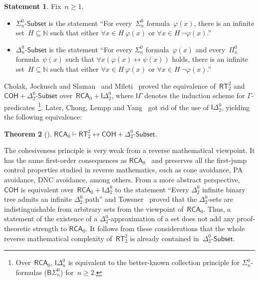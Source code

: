 \documentclass{article}
\def\NN{\mathbb{N}}
\newcommand{\IDelta}{\mathsf{I}\Delta^0}
\newcommand{\BSig}{\mathsf{B}\Sigma^0}
\newcommand{\Sub}[1]{{#1}\mbox{-}\mathsf{Subset}}
\newcommand{\RCA}{\mathsf{RCA}}
\newcommand{\COH}{\mathsf{COH}}
\newcommand{\RT}{\mathsf{RT}}
\def\qt#1{``#1''}%
\newtheorem{theorem}{Theorem}
\numberwithin{theorem}{section}
\theoremstyle{definition}
\newtheorem{statement}[theorem]{Statement}
\begin{document}
\begin{statement}Fix~$n \geq 1$.
\begin{itemize}
    \item $\Sub{\Sigma^0_n}$ is the statement \qt{For every~$\Sigma^0_n$ formula~$\varphi(x)$, there is an infinite set~$H \subseteq \NN$ such that either $\forall x \in H\ \varphi(x)$ or $\forall x \in H\ \neg \varphi(x)$.}
    \item $\Sub{\Delta^0_n}$ is the statement \qt{For every $\Sigma^0_n$ formula~$\varphi(x)$ and every~$\Pi^0_n$ formula~$\psi(x)$ such that $\forall x(\varphi(x) \leftrightarrow \psi(x))$ holds, there is an infinite set~$H \subseteq \NN$ such that either $\forall x \in H\ \varphi(x)$ or $\forall x \in H\ \neg \varphi(x)$.}
\end{itemize}
\end{statement}

Cholak, Jockusch and Slaman~\cite{cholak2001strength} and Mileti~\cite{mileti2004partition} proved the equivalence of~$\RT^2_2$ and $\COH + \Sub{\Delta^0_2}$ over~$\RCA_0 + \IDelta_2$, where $\mathsf{I}\Gamma$ denotes the induction scheme for $\Gamma$-predicates~\footnote{Over~$\RCA_0$, $\IDelta_n$ is equivalent to the better-known collection principle for $\Sigma^0_n$-formulas ($\BSig_n$) for~$n \geq 2$.}. Later, Chong, Lempp and Yang~\cite{chong2010role} got rid of the use of $\IDelta_2$, yielding the following equivalence:

\begin{theorem}[\cite{cholak2001strength,mileti2004partition,chong2010role}]
$\RCA_0 \vdash \RT^2_2 \leftrightarrow \COH + \Sub{\Delta^0_2}$.
\end{theorem}

The cohesiveness principle is very weak from a reverse mathematical viewpoint. It has the same first-order consequences as $\RCA_0$~\cite{cholak2001strength} and preserves all the first-jump control properties studied in reverse mathematics, such as cone avoidance, PA avoidance, DNC avoidance, among others. From a more abstract perspective, $\COH$ is equivalent over~$\RCA_0 + \IDelta_2$ to the statement \qt{Every $\Delta^0_2$ infinite binary tree admits an infinite $\Delta^0_2$ path}\cite{belanger2022conservation} and Towsner~\cite{townser2015maximum} proved that the $\Delta^0_2$-sets are indistinguishable from arbitrary sets from the viewpoint of~$\RCA_0$. Thus, a statement of the existence of a $\Delta^0_2$-approximation of a set does not add any proof-theoretic strength to $\RCA_0$. It follows from these considerations that the whole reverse mathematical complexity of~$\RT^2_2$ is already contained in~$\Sub{\Delta^0_2}$.
\end{document}

